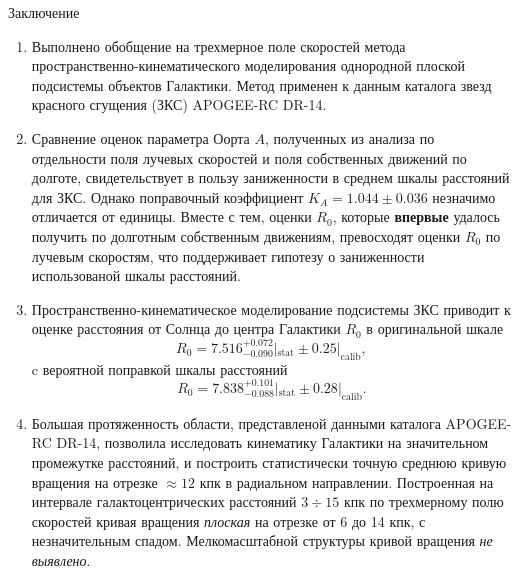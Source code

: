 \documentclass[compress]{beamer}
\newcommand\Fontvi{\fontsize{6}{7.2}\selectfont}
\begin{document}
\begin{frame}{Заключение}
        \Fontvi
\begin{enumerate}
        \item Выполнено обобщение на трехмерное поле скоростей метода пространственно-кинематического моделирования однородной плоской подсистемы объектов Галактики. Метод применен к данным каталога звезд красного сгущения (ЗКС) APOGEE-RC DR-14.
        \item Сравнение оценок параметра Оорта $A$, полученных из анализа по отдельности поля лучевых скоростей и поля собственных движений по долготе, свидетельствует в пользу заниженности в среднем шкалы расстояний для ЗКС. Однако поправочный коэффициент $K_A = 1.044 \pm 0.036$ незначимо отличается от единицы. Вместе с тем, оценки $R_0$, которые \textbf{впервые} удалось получить по долготным собственным движениям, превосходят оценки $R_0$ по лучевым скоростям, что поддерживает гипотезу о заниженности использованой шкалы расстояний. 
        \item Пространственно-кинематическое моделирование подсистемы ЗКС приводит к оценке расстояния от Солнца до центра Галактики $R_0$ в оригинальной шкале
                \begin{equation}
                        R_0 = 7.516^{+0.072}_{-0.090}|_{\mathrm{stat}} \pm 0.25 |_{\mathrm{calib}} , \nonumber
                \end{equation}
                c вероятной поправкой шкалы расстояний
                \begin{equation}
                        R_0 = 7.838^{+0.101}_{-0.088}|_{\mathrm{stat}} \pm 0.28 |_{\mathrm{calib}} . \nonumber
                \end{equation}
\item Большая протяженность области, представленой данными каталога APOGEE-RC DR-14, позволила исследовать кинематику Галактики на значительном промежутке расстояний, и построить статистически точную среднюю кривую вращения на отрезке ${\approx}12$ кпк в радиальном направлении. Построенная на интервале галактоцентрических расстояний $3\div15$ кпк по трехмерному полю скоростей кривая вращения \textit{плоская} на отрезке от 6 до 14 кпк, с незначительным спадом. Мелкомасштабной структуры кривой вращения \textit{не выявлено}.
\end{enumerate}
\end{frame}


%
\end{document}
